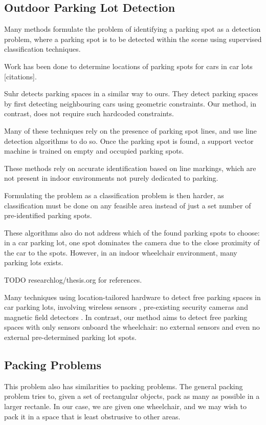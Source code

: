 \subsection{Outdoor Parking Lot Detection}

Many methods formulate the problem of identifying a parking spot
as a detection problem, where a parking spot is to be detected within the scene
using supervised classification techniques.

Work has been done to determine locations of parking spots for cars in car lots
[citations]. 
\cite{wu2006parking, true2007vacant}

Suhr \cite{suhr2010automatic} detects parking spaces in a similar way to ours.
They detect parking spaces by first detecting neighbouring cars using geometric
constraints. Our method, in contrast, does not require such hardcoded
constraints.


Many of these techniques rely on the presence of parking spot
lines, and use line detection algorithms to do so. Once the parking spot is
found, a support vector machine is trained on empty and occupied parking spots.

These methods rely on accurate identification based on line markings, which are
not present in indoor environments not purely dedicated to parking. 

Formulating the problem as a classification problem is then harder, as
classification must be done on any feasible area instead of just a set number of
pre-identified parking spots.

These algorithms also do not address which of the found parking spots to choose:
in a car parking lot, one spot dominates the camera due to the close proximity
of the car to the spots. However, in an indoor wheelchair environment, many
parking lots exists.

TODO researchlog/thesis.org for references.

Many techniques using location-tailored hardware to detect free parking spaces
in car parking lots, involving wireless sensors \cite{panja2011wirelessly},
pre-existing security cameras \cite{true2007vacant} and magnetic field detectors
\cite{boda2007design}. In contrast, our method aims to detect free parking
spaces with only sensors onboard the wheelchair: no external sensors and even no
external pre-determined parking lot spots.


\subsection{Packing Problems}
This problem also has similarities to packing problems. The general packing
problem tries to, given a set of rectangular objects, pack as many as possible
in a larger rectanle. In our case, we are given one wheelchair, and we may wish
to pack it in a space that is least obstrusive to other areas.

